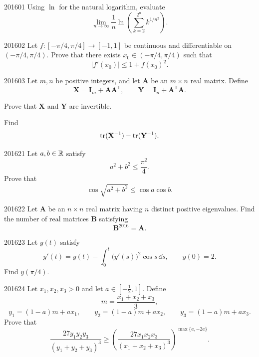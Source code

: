 
\begin{problem}{2016}{0}{1}
Using $\ln$ for the natural logarithm, evaluate
\[
    \lim_{n\to\infty}
    \frac1n
    \ln\left(
        \sum_{k=2}^{2^n}k^{1/n^2}
    \right).
\]
\end{problem}

\begin{problem}{2016}{0}{2}
Let $f\colon[-\pi/4, \pi/4]\to[-1, 1]$ be continuous and differentiable on $(-\pi/4, \pi/4)$. Prove that there exists $x_0\in(-\pi/4, \pi/4)$ such that
\[
    |f'(x_0)|\le1+f(x_0)^2.
\]
\end{problem}

\begin{problem}{2016}{0}{3}
Let $m, n$ be positive integers, and let $\mathbf A$ be an $m\times n$ real matrix. Define
\[
    \mathbf X=\mathbf I_m+\mathbf A\mathbf A^{\mathsf T},
    \qquad
    \mathbf Y=\mathbf I_n+\mathbf A^{\mathsf T}\mathbf A.
\]
\begin{problemsubparts}
    \item Prove that $\mathbf X$ and $\mathbf Y$ are invertible.
    \item Find
    \[
        \operatorname{tr}(\mathbf X^{-1})-\operatorname{tr}(\mathbf Y^{-1}).
    \]
\end{problemsubparts}
\end{problem}

\begin{problem}{2016}{2}{1}
Let $a, b\in\mathbb{R}$ satisfy
\[
    a^2+b^2\le\frac{\pi^2}{4}.
\]
Prove that
\[
    \cos\sqrt{a^2+b^2}\le\cos a\cos b.
\]
\end{problem}

\begin{problem}{2016}{2}{2}
Let $\mathbf A$ be an $n\times n$ real matrix having $n$ distinct positive eigenvalues. Find the number of real matrices $\mathbf B$ satisfying
\[
    \mathbf B^{2016}=\mathbf A.
\]
\end{problem}

\begin{problem}{2016}{2}{3}
Let $y(t)$ satisfy
\[
    y'(t)
    =y(t)-\int_0^t\bigl(y'(s)\bigr)^2\cos s\, \dd s,
    \qquad
    y(0)=2.
\]
Find $y(\pi/4)$.
\end{problem}

\begin{problem}{2016}{2}{4}
Let $x_1, x_2, x_3>0$ and let $a\in[-\tfrac12, 1]$. Define
\[
    m=\frac{x_1+x_2+x_3}{3},
\]
\[
    y_1=(1-a)m+ax_1,
    \qquad
    y_2=(1-a)m+ax_2,
    \qquad
    y_3=(1-a)m+ax_3.
\]
Prove that
\[
    \frac{27y_1y_2y_3}{(y_1+y_2+y_3)^3}
    \ge
    \left(
        \frac{27x_1x_2x_3}{(x_1+x_2+x_3)^3}
    \right)^{\max\{a, -2a\}}.
\]
\end{problem}

